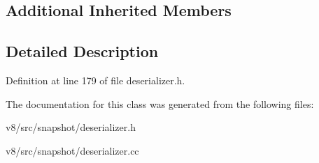 \subsection*{Additional Inherited Members}


\subsection{Detailed Description}


Definition at line 179 of file deserializer.\+h.



The documentation for this class was generated from the following files\+:\begin{DoxyCompactItemize}
\item 
v8/src/snapshot/deserializer.\+h\item 
v8/src/snapshot/deserializer.\+cc\end{DoxyCompactItemize}
